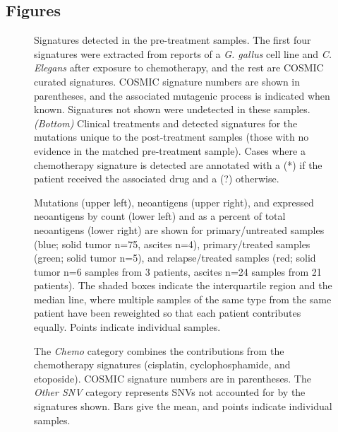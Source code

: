 \documentclass[linenumbers]{bmcart}
\begin{document}
\begin{backmatter}

\section*{Figures}

\begin{figure}[h!]
  \caption{
      Signatures detected in the pre-treatment samples. The first four signatures were extracted from reports of a \textit{G. gallus} cell line and \textit{C. Elegans} after exposure to chemotherapy, and the rest are COSMIC curated signatures. COSMIC signature numbers are shown in parentheses, and the associated mutagenic process is indicated when known. Signatures not shown were undetected in these samples. \textit{(Bottom)} Clinical treatments and detected signatures for the mutations unique to the post-treatment samples (those with no evidence in the matched pre-treatment sample). Cases where a chemotherapy signature is detected are annotated with a (*) if the patient received the associated drug and a (?) otherwise.}
      \end{figure}

  \begin{figure}[h!]
  \caption{
      Mutations (upper left), neoantigens (upper right), and expressed neoantigens by count (lower left) and as a percent of total neoantigens (lower right) are shown for primary/untreated samples (blue; solid tumor n=75, ascites n=4), primary/treated samples (green; solid tumor n=5), and relapse/treated samples (red; solid tumor n=6 samples from 3 patients, ascites n=24 samples from 21 patients). The shaded boxes indicate the interquartile region and the median line, where multiple samples of the same type from the same patient have been reweighted so that each patient contributes equally. Points indicate individual samples.}
      \end{figure}
      
\begin{figure}[h!]
  \caption{
      The \textit{Chemo} category combines the contributions from the chemotherapy signatures (cisplatin, cyclophosphamide, and etoposide). COSMIC signature numbers are in parentheses. The \textit{Other SNV} category represents SNVs not accounted for by the signatures shown. Bars give the mean, and points indicate individual samples.}
      \end{figure}


\end{backmatter}
\end{document}
